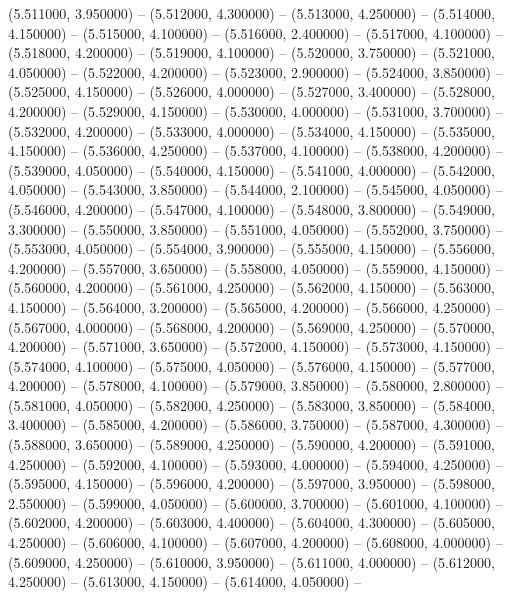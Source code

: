 (5.511000, 3.950000) -- 
(5.512000, 4.300000) -- 
(5.513000, 4.250000) -- 
(5.514000, 4.150000) -- 
(5.515000, 4.100000) -- 
(5.516000, 2.400000) -- 
(5.517000, 4.100000) -- 
(5.518000, 4.200000) -- 
(5.519000, 4.100000) -- 
(5.520000, 3.750000) -- 
(5.521000, 4.050000) -- 
(5.522000, 4.200000) -- 
(5.523000, 2.900000) -- 
(5.524000, 3.850000) -- 
(5.525000, 4.150000) -- 
(5.526000, 4.000000) -- 
(5.527000, 3.400000) -- 
(5.528000, 4.200000) -- 
(5.529000, 4.150000) -- 
(5.530000, 4.000000) -- 
(5.531000, 3.700000) -- 
(5.532000, 4.200000) -- 
(5.533000, 4.000000) -- 
(5.534000, 4.150000) -- 
(5.535000, 4.150000) -- 
(5.536000, 4.250000) -- 
(5.537000, 4.100000) -- 
(5.538000, 4.200000) -- 
(5.539000, 4.050000) -- 
(5.540000, 4.150000) -- 
(5.541000, 4.000000) -- 
(5.542000, 4.050000) -- 
(5.543000, 3.850000) -- 
(5.544000, 2.100000) -- 
(5.545000, 4.050000) -- 
(5.546000, 4.200000) -- 
(5.547000, 4.100000) -- 
(5.548000, 3.800000) -- 
(5.549000, 3.300000) -- 
(5.550000, 3.850000) -- 
(5.551000, 4.050000) -- 
(5.552000, 3.750000) -- 
(5.553000, 4.050000) -- 
(5.554000, 3.900000) -- 
(5.555000, 4.150000) -- 
(5.556000, 4.200000) -- 
(5.557000, 3.650000) -- 
(5.558000, 4.050000) -- 
(5.559000, 4.150000) -- 
(5.560000, 4.200000) -- 
(5.561000, 4.250000) -- 
(5.562000, 4.150000) -- 
(5.563000, 4.150000) -- 
(5.564000, 3.200000) -- 
(5.565000, 4.200000) -- 
(5.566000, 4.250000) -- 
(5.567000, 4.000000) -- 
(5.568000, 4.200000) -- 
(5.569000, 4.250000) -- 
(5.570000, 4.200000) -- 
(5.571000, 3.650000) -- 
(5.572000, 4.150000) -- 
(5.573000, 4.150000) -- 
(5.574000, 4.100000) -- 
(5.575000, 4.050000) -- 
(5.576000, 4.150000) -- 
(5.577000, 4.200000) -- 
(5.578000, 4.100000) -- 
(5.579000, 3.850000) -- 
(5.580000, 2.800000) -- 
(5.581000, 4.050000) -- 
(5.582000, 4.250000) -- 
(5.583000, 3.850000) -- 
(5.584000, 3.400000) -- 
(5.585000, 4.200000) -- 
(5.586000, 3.750000) -- 
(5.587000, 4.300000) -- 
(5.588000, 3.650000) -- 
(5.589000, 4.250000) -- 
(5.590000, 4.200000) -- 
(5.591000, 4.250000) -- 
(5.592000, 4.100000) -- 
(5.593000, 4.000000) -- 
(5.594000, 4.250000) -- 
(5.595000, 4.150000) -- 
(5.596000, 4.200000) -- 
(5.597000, 3.950000) -- 
(5.598000, 2.550000) -- 
(5.599000, 4.050000) -- 
(5.600000, 3.700000) -- 
(5.601000, 4.100000) -- 
(5.602000, 4.200000) -- 
(5.603000, 4.400000) -- 
(5.604000, 4.300000) -- 
(5.605000, 4.250000) -- 
(5.606000, 4.100000) -- 
(5.607000, 4.200000) -- 
(5.608000, 4.000000) -- 
(5.609000, 4.250000) -- 
(5.610000, 3.950000) -- 
(5.611000, 4.000000) -- 
(5.612000, 4.250000) -- 
(5.613000, 4.150000) -- 
(5.614000, 4.050000) -- 
